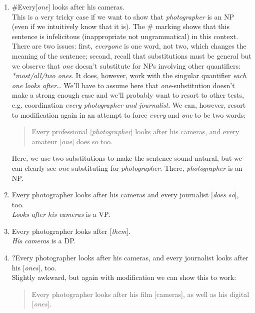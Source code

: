 \documentclass[a4paper,12pt]{article}
\begin{document}
\begin{enumerate}
\begin{enumerate}
         \item \#{}Every[\textit{one}] looks after his cameras.\\
         This is a very tricky case if we want to show that \textit{photographer} is an NP (even if we intuitively know that it is). The \# marking shows that this sentence is infelicitous (inappropriate not ungrammatical) in this context. There are two issues: first, \textit{everyone} is one word, not two, which changes the meaning of the sentence; second, recall that substitutions must be general but we observe that \textit{one} doesn't substitute for NPs involving other quantifiers: \textit{*most/all/two ones}. It does, however, work with the singular quantifier \textit{each one looks after\dots} We'll have to assume here that \textit{one}-substitution doesn't make a strong enough case and we'll probably want to resort to other tests, e.g. coordination \textit{every photographer and journalist}. We can, however, resort to modification again in an attempt to force \textit{every} and \textit{one} to be two words:

         \begin{quote}
            Every professional [\textit{photographer}] looks after his cameras, and every amateur [\textit{one}] does so too.
         \end{quote}

         Here, we use two substitutions to make the sentence sound natural, but we can clearly see \textit{one} substituting for \textit{photographer}. There, \textit{photographer} is an NP.

         \item Every photographer looks after his cameras and every journalist [\textit{does so}], too.\\
         \textit{Looks after his cameras} is a VP.

         \item Every photographer looks after [\textit{them}].\\
         \textit{His cameras} is a DP.

         \item ?Every photographer looks after his cameras, and every journalist looks after his [\textit{ones}], too.\\
             Slightly awkward, but again with modification we can show this to work:
             \begin{quote}
             Every photographer looks after his film [cameras], as well as his digital [\textit{ones}].
             \end{quote}


\end{enumerate}
\end{enumerate}
\end{document}

